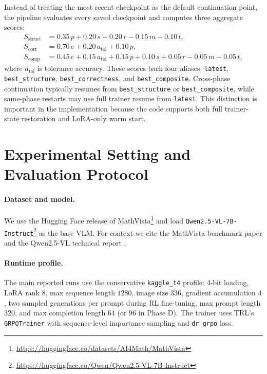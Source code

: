 \documentclass{article} %
\begin{document}
Instead of treating the most recent checkpoint as the default continuation point, the pipeline evaluates every saved checkpoint and computes three aggregate scores:
\begin{align}
S_{\text{struct}} &= 0.35\,p + 0.20\,s + 0.20\,r - 0.15\,m - 0.10\,t, \\
S_{\text{corr}} &= 0.70\,e + 0.20\,a_{\text{tol}} + 0.10\,p, \\
S_{\text{comp}} &= 0.45\,e + 0.15\,a_{\text{tol}} + 0.15\,p + 0.10\,s + 0.05\,r - 0.05\,m - 0.05\,t,
\end{align}
where $a_{\text{tol}}$ is tolerance accuracy. These scores back four aliases: \texttt{latest}, \texttt{best\_structure}, \texttt{best\_correctness}, and \texttt{best\_composite}. Cross-phase continuation typically resumes from \texttt{best\_structure} or \texttt{best\_composite}, while same-phase restarts may use full trainer resume from \texttt{latest}. This distinction is important in the implementation because the code supports both full trainer-state restoration and LoRA-only warm start.

\section{Experimental Setting and Evaluation Protocol}

\paragraph{Dataset and model.}
We use the Hugging Face release of MathVista\footnote{\url{https://huggingface.co/datasets/AI4Math/MathVista}} and load \texttt{Qwen2.5-VL-7B-Instruct}\footnote{\url{https://huggingface.co/Qwen/Qwen2.5-VL-7B-Instruct}} as the base VLM. For context we cite the MathVista benchmark paper \citep{lu2024mathvista} and the Qwen2.5-VL technical report \citep{bai2025qwen25vl}.

\paragraph{Runtime profile.}
The main reported runs use the conservative \texttt{kaggle\_t4} profile: 4-bit loading, LoRA rank $8$, max sequence length $1280$, image size $336$, gradient accumulation $4$, two sampled generations per prompt during RL fine-tuning, max prompt length $320$, and max completion length $64$ (or $96$ in Phase D). The trainer uses TRL's \texttt{GRPOTrainer} with sequence-level importance sampling and \texttt{dr\_grpo} loss.
\end{document}

